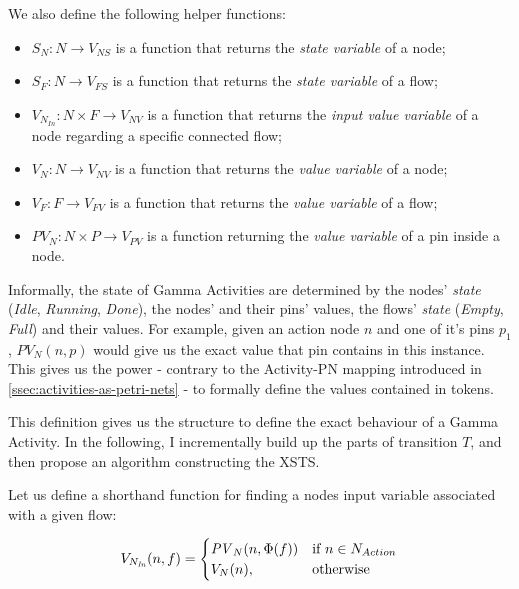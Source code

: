 We also define the following helper functions:

\begin{itemize}
	\item \(S_N : N \rightarrow V_\mathit{NS} \) is a function that returns the \emph{state variable} of a node;
	\item \(S_F : N \rightarrow V_\mathit{FS} \) is a function that returns the \emph{state variable} of a flow;
	\item \(V_{N_\mathit{In}} : N \times F \rightarrow V_\mathit{NV} \) is a function that returns the \emph{input value variable} of a node regarding a specific connected flow;
	\item \(V_N : N \rightarrow V_\mathit{NV} \) is a function that returns the \emph{value variable} of a node;
	\item \(V_F : F \rightarrow V_\mathit{FV} \) is a function that returns the \emph{value variable} of a flow;
	\item \(\mathit{PV}_N : N \times P \rightarrow V_\mathit{PV} \) is a function returning the \emph{value variable} of a pin inside a node.
\end{itemize}

Informally, the state of Gamma Activities are determined by the nodes' \emph{state} (\emph{Idle}, \emph{Running}, \emph{Done}), the nodes' and their pins' values, the flows' \emph{state} (\emph{Empty}, \emph{Full}) and their values. For example, given an action node \(n\) and one of it's pins \(p_1\), \(\mathit{PV}_N(n, p)\) would give us the exact value that pin contains in this instance. This gives us the power - contrary to the Activity-PN mapping introduced in \autoref{ssec:activities-as-petri-nets} - to formally define the values contained in tokens.

This definition gives us the structure to define the exact behaviour of a Gamma Activity. In the following, I incrementally build up the parts of transition \(T\), and then propose an algorithm constructing the XSTS. 

Let us define a shorthand function for finding a nodes input variable associated with a given flow:

\begin{equation*}
	V_{N_\mathit{In}}(n, f) = 
	\begin{cases}
		\mathit{PV}_N(n, \Phi(f)) & \text{if } n \in N_{Action} \\
		V_N(n), & \text{otherwise}
	\end{cases}
\end{equation*}

